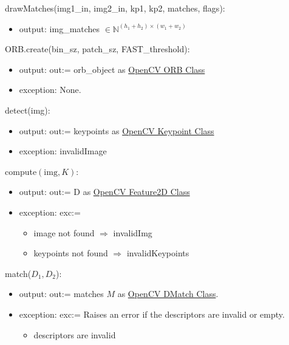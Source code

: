 \documentclass[12pt, titlepage]{article}
\begin{document}
\noindent drawMatches(img1\_in, img2\_in, kp1, kp2, matches, flags):
\begin{itemize}
\item output: img\_matches $\in \mathbb{N}^{(h_{1}+h_{2}) \times (w_{1}+w_{2})}$
\end{itemize}

\noindent ORB.create(bin\_sz, patch\_sz, FAST\_threshold):
\begin{itemize}
    \item output: out:= orb\_object as \href{https://docs.opencv.org/3.4/db/d95/classcv_1_1ORB.html}{OpenCV ORB Class}
    \item exception: None. 
\end{itemize}

\noindent detect(img):
\begin{itemize}
    \item output: out:= keypoints as \href{https://docs.opencv.org/3.4/d2/d29/classcv_1_1KeyPoint.html}{OpenCV Keypoint Class}
    \item exception: invalidImage
\end{itemize}

\noindent compute$(\text{img}, K)$:
\begin{itemize}
    \item output: out:= D as \href{https://docs.opencv.org/4.x/d0/d13/classcv_1_1Feature2D.html}{OpenCV Feature2D Class}
    \item exception: exc:=
    \begin{itemize}
      \item image not found $\Rightarrow$ invalidImg
      \item keypoints not found $\Rightarrow$ invalidKeypoints
    \end{itemize}
\end{itemize}

\noindent match($D_1, D_2$):
\begin{itemize}
\item output: out:= matches $M$ as \href{https://docs.opencv.org/3.4/d4/de0/classcv_1_1DMatch.html}{OpenCV DMatch Class}.
\item exception: exc:= Raises an error if the descriptors are invalid or empty.
  \begin{itemize}
      \item descriptors are invalid
  \end{itemize}
\end{itemize}
\end{document}
